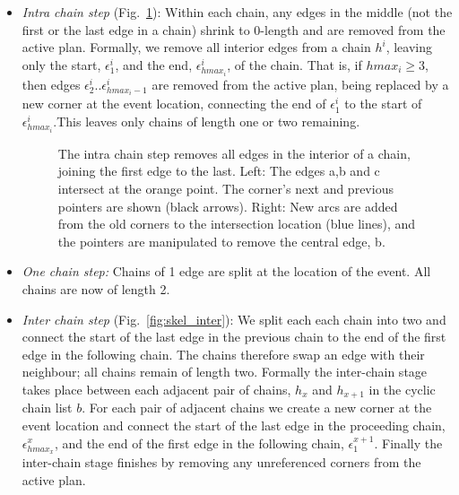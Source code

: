 \begin{itemize}
\item{\emph{Intra chain step} (Fig.~\ref{fig:skel_intra}): Within each chain, any edges in the middle (not the first or the last edge in a chain) shrink to 0-length and are removed from the active plan. Formally, we remove all interior edges from a chain $h^i$, leaving only the start, $\epsilon^i_1$, and the end, $\epsilon^i_{hmax_i}$,  of the chain. That is, if $hmax_i \ge 3$, then edges $\epsilon^i_2..\epsilon^i_{hmax_i-1}$ are removed from the active plan, being replaced by a new corner at the event location, connecting the end of $\epsilon^i_1$ to the start of  $\epsilon^i_{hmax_i}$.This leaves only chains of length one or two remaining. }

\begin{figure}
  \centering
  \def\svgwidth{0.8\columnwidth}
  
  \caption[Intra chain pointer manipulation]{\label{fig:skel_intra}The intra chain step removes all edges in the interior of a chain, joining the first edge to the last. Left: The edges a,b and c intersect at the orange point. The corner's next and previous pointers are shown (black arrows). Right: New arcs are added from the old corners to the intersection location (blue lines), and the pointers are manipulated to remove the central edge, b.}
\end{figure}

\item{\emph{One chain step:} Chains of 1 edge are split at the location of the event. All chains are now of length 2.}
\item{\emph{Inter chain step} (Fig.~\ref{fig:skel_inter}): We split each each chain into two and connect the start of the last edge in the previous chain to the end of the first edge in the following chain. The chains therefore swap an edge with their neighbour; all chains remain of length two. Formally the inter-chain stage takes place between each adjacent pair of chains, $h_x$ and $h_{x+1}$ in the cyclic chain list $b$.
For each pair of adjacent chains we create a new corner at the event location and connect the start of the last edge in the proceeding chain, $\epsilon^x_{hmax_x}$, and the end of the first edge in the following chain, $\epsilon^{x+1}_{1}$. 
Finally the inter-chain stage finishes by removing any unreferenced corners from the active plan.
}



\end{itemize}
